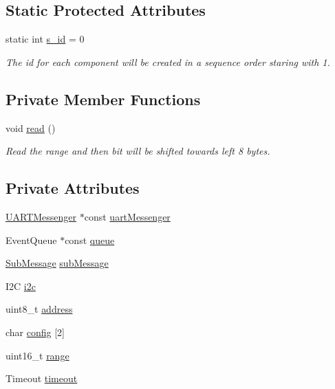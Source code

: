 \subsection*{Static Protected Attributes}
\begin{DoxyCompactItemize}
\item 
static int \hyperlink{class_abstract_component_a99ce3e5fe7d73dac569b874c15fcaf0d}{s\+\_\+id} = 0
\begin{DoxyCompactList}\small\item\em The id for each component will be created in a sequence order staring with 1. \end{DoxyCompactList}\end{DoxyCompactItemize}
\subsection*{Private Member Functions}
\begin{DoxyCompactItemize}
\item 
void \hyperlink{class_sonar_af7a8bb36d925d164b31ff271f9006dc7}{read} ()
\begin{DoxyCompactList}\small\item\em Read the range and then bit will be shifted towards left 8 bytes. \end{DoxyCompactList}\end{DoxyCompactItemize}
\subsection*{Private Attributes}
\begin{DoxyCompactItemize}
\item 
\hyperlink{class_u_a_r_t_messenger}{U\+A\+R\+T\+Messenger} $\ast$const \hyperlink{class_sonar_a63b5d2455e9278c9d3c6dded215789f6}{uart\+Messenger}
\item 
Event\+Queue $\ast$const \hyperlink{class_sonar_af0431d160853c8313eba0fd0e1ce8346}{queue}
\item 
\hyperlink{struct_sub_message}{Sub\+Message} \hyperlink{class_sonar_a08f09f7abe342846e6e97b8dd76d623b}{sub\+Message}
\item 
I2C \hyperlink{class_sonar_ae6be174d7fc69e27ae5d932b26a5a003}{i2c}
\item 
uint8\+\_\+t \hyperlink{class_sonar_aa42fef5da4ff8d80353143a74eff2ae2}{address}
\item 
char \hyperlink{class_sonar_a6a5dc5e466fc0c7a8cb2fc50af10db45}{config} \mbox{[}2\mbox{]}
\item 
uint16\+\_\+t \hyperlink{class_sonar_a6b0f78a9151925ca61fe54c852c195bd}{range}
\item 
Timeout \hyperlink{class_sonar_a4b3cc5317263c63dd58195f3c2c94da6}{timeout}
\end{DoxyCompactItemize}


